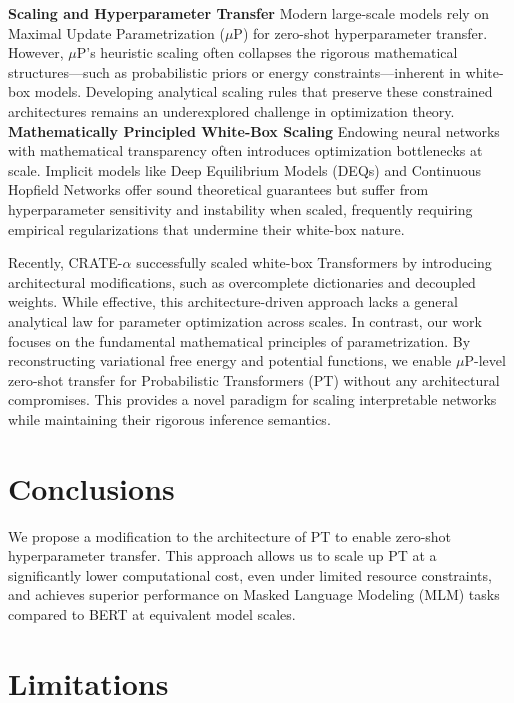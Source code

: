 \documentclass[11pt]{article}
\begin{document}
\textbf{Scaling and Hyperparameter Transfer} Modern large-scale models rely on Maximal Update Parametrization ($\mu$P) \cite{yang2022tensor} for zero-shot hyperparameter transfer. However, $\mu$P’s heuristic scaling often collapses the rigorous mathematical structures—such as probabilistic priors or energy constraints—inherent in white-box models. Developing analytical scaling rules that preserve these constrained architectures remains an underexplored challenge in optimization theory.\\

\noindent
\textbf{Mathematically Principled White-Box Scaling} Endowing neural networks with mathematical transparency often introduces optimization bottlenecks at scale. Implicit models like Deep Equilibrium Models (DEQs) \cite{bai2019deep,bai2020multiscale} and Continuous Hopfield Networks \cite{ramsauer2020hopfield} offer sound theoretical guarantees but suffer from hyperparameter sensitivity and instability when scaled, frequently requiring empirical regularizations that undermine their white-box nature.

Recently, CRATE-$\alpha$ \cite{yang2024scaling} successfully scaled white-box Transformers by introducing architectural modifications, such as overcomplete dictionaries and decoupled weights. While effective, this architecture-driven approach lacks a general analytical law for parameter optimization across scales. In contrast, our work focuses on the fundamental mathematical principles of parametrization. By reconstructing variational free energy and potential functions, we enable $\mu$P-level zero-shot transfer for Probabilistic Transformers (PT) without any architectural compromises. This provides a novel paradigm for scaling interpretable networks while maintaining their rigorous inference semantics.



\section{Conclusions}
\label{sec:bibtex}

We propose a modification to the architecture of PT to enable zero-shot hyperparameter transfer. This approach allows us to scale up PT at a significantly lower computational cost, even under limited resource constraints, and achieves superior performance on Masked Language Modeling (MLM) tasks compared to BERT \cite{devlin2019bert} at equivalent model scales.

\section*{Limitations}
\end{document}

